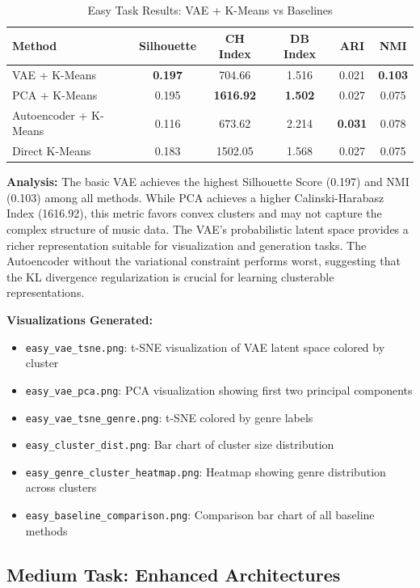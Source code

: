 \documentclass{article}
\begin{document}
\begin{table}[h]
\caption{Easy Task Results: VAE + K-Means vs Baselines}
\label{tab:easy}
\centering
\begin{tabular}{lccccc}
\toprule
Method & Silhouette & CH Index & DB Index & ARI & NMI \\
\midrule
VAE + K-Means & \textbf{0.197} & 704.66 & 1.516 & 0.021 & \textbf{0.103} \\
PCA + K-Means & 0.195 & \textbf{1616.92} & \textbf{1.502} & 0.027 & 0.075 \\
Autoencoder + K-Means & 0.116 & 673.62 & 2.214 & \textbf{0.031} & 0.078 \\
Direct K-Means & 0.183 & 1502.05 & 1.568 & 0.027 & 0.075 \\
\bottomrule
\end{tabular}
\end{table}

\textbf{Analysis:} The basic VAE achieves the highest Silhouette Score (0.197) and NMI (0.103) among all methods. While PCA achieves a higher Calinski-Harabasz Index (1616.92), this metric favors convex clusters and may not capture the complex structure of music data. The VAE's probabilistic latent space provides a richer representation suitable for visualization and generation tasks. The Autoencoder without the variational constraint performs worst, suggesting that the KL divergence regularization is crucial for learning clusterable representations.

\textbf{Visualizations Generated:}
\begin{itemize}
    \item \texttt{easy\_vae\_tsne.png}: t-SNE visualization of VAE latent space colored by cluster
    \item \texttt{easy\_vae\_pca.png}: PCA visualization showing first two principal components
    \item \texttt{easy\_vae\_tsne\_genre.png}: t-SNE colored by genre labels
    \item \texttt{easy\_cluster\_dist.png}: Bar chart of cluster size distribution
    \item \texttt{easy\_genre\_cluster\_heatmap.png}: Heatmap showing genre distribution across clusters
    \item \texttt{easy\_baseline\_comparison.png}: Comparison bar chart of all baseline methods
\end{itemize}

\subsection{Medium Task: Enhanced Architectures}
\end{document}
